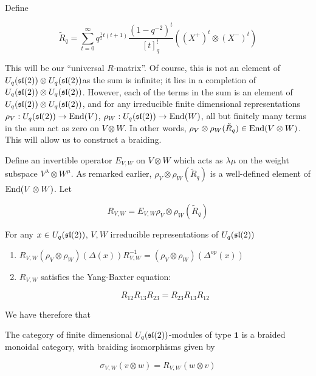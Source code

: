 
Define 

\begin{equation}
\tilde{R}_q = \sum_{t=0}^\infty q^{\frac{1}{2} t(t+1)} \frac{(1-q^{-2})^t}{[t]_q^{!}} ((X^+)^t \otimes (X^-)^t)
\end{equation}

This will be our ``universal $R$-matrix''. Of course, this is not an element of
$U_q(\mathfrak{sl}(2)) \otimes U_q(\mathfrak{sl}(2))$as the sum is infinite; it lies in a
completion of $U_q(\mathfrak{sl}(2)) \otimes U_q(\mathfrak{sl}(2))$. However, each of the terms
in the sum is an element of $U_q(\mathfrak{sl}(2)) \otimes U_q(\mathfrak{sl}(2))$, and for any
irreducible finite dimensional representations $\rho_V : U_q(\mathfrak{sl}(2)) \to
\operatorname{End}(V)$, $\rho_W : U_q(\mathfrak{sl}(2)) \to \operatorname{End}(W)$, all but finitely many terms in the
sum act as zero on $V \otimes W$. In other words, $\rho_V \otimes \rho_W
(\tilde{R}_q) \in \operatorname{End}(V \otimes W)$. This will allow us to construct a
braiding.


Define an invertible operator $E_{V,W}$ on $V \otimes W$ which acts as
$\lambda\mu$ on the weight subspace $V^\lambda \otimes W^\mu$. As remarked
earlier, $\rho_V \otimes \rho_W (\tilde{R}_q) $ is a well-defined element of
$\operatorname{End}(V \otimes W)$. Let 

\begin{equation}
R_{V,W} = E_{V,W} \rho_V \otimes \rho_W (\tilde{R}_q)
\end{equation}

\begin{claim}
For any $x \in U_q(\mathfrak{sl}(2))$, $V,W$ irreducible representations of $U_q(\mathfrak{sl}(2))$
\begin{enumerate}
\item $R_{V,W} (\rho_V \otimes \rho_W) (\Delta(x)) R^{-1}_{V,W} = (\rho_{V} \otimes \rho_W)(\Delta^{op}(x))$
\item $R_{V,W}$  satisfies the Yang-Baxter equation: 

\begin{equation}
R_{12} R_{13} R_{23} = R_{23} R_{13} R_{12}
\end{equation}
\end{enumerate}
\end{claim}

We have therefore that 

\begin{theorem}
The category of finite dimensional $U_q(\mathfrak{sl}(2))$-modules of type $\mathbf{1}$ is a braided monoidal category, with braiding isomorphisms given by 

\begin{equation}
\sigma_{V,W}(v \otimes w) = R_{V,W}(w \otimes v)
\end{equation}
\end{theorem}


